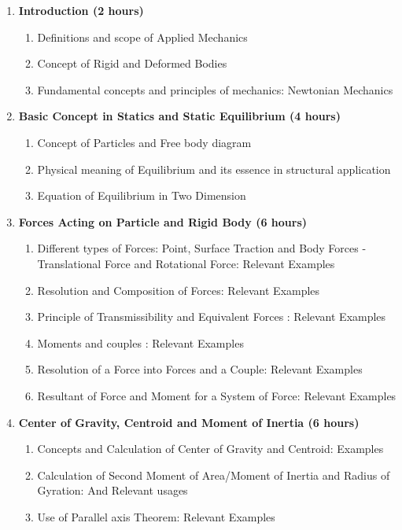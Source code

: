 \begin{enumerate}
    \item \textbf{Introduction \hfill (2 hours)}
    \begin{enumerate}
        \item Definitions and scope of Applied Mechanics
        \item Concept of Rigid and Deformed Bodies
        \item Fundamental concepts and principles of mechanics: Newtonian Mechanics
    \end{enumerate}
    
    \item \textbf{Basic Concept in Statics and Static Equilibrium \hfill (4 hours)}
    \begin{enumerate}
        \item Concept of Particles and Free body diagram
        \item Physical meaning of Equilibrium and its essence in structural application
        \item Equation of Equilibrium in Two Dimension
    \end{enumerate}
    
    \item \textbf{Forces Acting on Particle and Rigid Body \hfill (6 hours)}
    \begin{enumerate}
        \item Different types of Forces: Point, Surface Traction and Body Forces - Translational Force and Rotational Force: Relevant Examples
        \item Resolution and Composition of Forces: Relevant Examples
        \item Principle of Transmissibility and Equivalent Forces : Relevant Examples
        \item Moments and couples : Relevant Examples
        \item Resolution of a Force into Forces and a Couple: Relevant Examples
        \item Resultant of Force and Moment for a System of Force: Relevant Examples
    \end{enumerate}
    
    \item \textbf{Center of Gravity, Centroid and Moment of Inertia \hfill (6 hours)}
    \begin{enumerate}
        \item Concepts and Calculation of Center of Gravity and Centroid: Examples
        \item Calculation of Second Moment of Area/Moment of Inertia and Radius of Gyration: And Relevant usages
        \item Use of Parallel axis Theorem: Relevant Examples
    \end{enumerate}
    

\end{enumerate}
